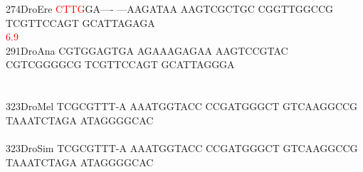\documentclass[11pt,twoside,reqno,a4paper]{article}
\begin{document}
{274\hspace*{1\charwidth}DroEre	\textcolor{Red}{C}\textcolor{Red}{T}\textcolor{Red}{T}\textcolor{Red}{G}GA----	---AAGATAA	AAGTCGCTGC	CGGTTGGCCG	TCGTTCCAGT	GCATTAGAGA	\\
\hspace*{4\charwidth}\hspace*{7\charwidth}\hspace*{0\charwidth}\textcolor{Red}{6.9}\hspace*{1\charwidth}\hspace*{1\charwidth}\hspace*{1\charwidth}\hspace*{1\charwidth}\hspace*{1\charwidth}\hspace*{1\charwidth}\\
291\hspace*{1\charwidth}DroAna	CGTGGAGTGA	AGAAAGAGAA	AAGTCCGTAC	CGTCGGGGCG	TCGTTCCAGT	GCATTAGGGA	\\
\hspace*{4\charwidth}\hspace*{7\charwidth}\hspace*{1\charwidth}\hspace*{1\charwidth}\hspace*{1\charwidth}\hspace*{1\charwidth}\hspace*{1\charwidth}\hspace*{1\charwidth}\\
\\
323\hspace*{1\charwidth}DroMel	TCGCGTTT-A	AAATGGTACC	CCGATGGGCT	GTCAAGGCCG	TAAATCTAGA	ATAGGGGCAC	\\
\hspace*{4\charwidth}\hspace*{7\charwidth}\hspace*{1\charwidth}\hspace*{1\charwidth}\hspace*{1\charwidth}\hspace*{1\charwidth}\hspace*{1\charwidth}\hspace*{1\charwidth}\\
323\hspace*{1\charwidth}DroSim	TCGCGTTT-A	AAATGGTACC	CCGATGGGCT	GTCAAGGCCG	TAAATCTAGA	ATAGGGGCAC	\\
\hspace*{4\charwidth}\hspace*{7\charwidth}\hspace*{1\charwidth}\hspace*{1\charwidth}\hspace*{1\charwidth}\hspace*{1\charwidth}\hspace*{1\charwidth}\hspace*{1\charwidth}\\
}
\end{document}
